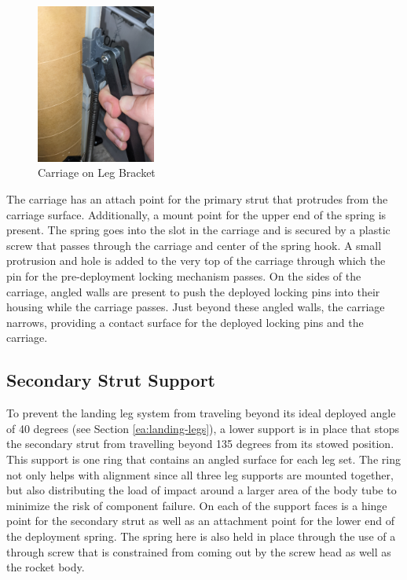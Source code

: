 \begin{figure}[H]
    \centering
    \includegraphics[width=0.35\textwidth]{src/figs/Carriage_Leg.jpg}
    \caption{Carriage on Leg Bracket}
    \label{fig:CLB}
\end{figure}

The carriage has an attach point for the primary strut that protrudes from the carriage surface. Additionally, a mount point for the upper end of the spring is present. The spring goes into the slot in the carriage and is secured by a plastic screw that passes through the carriage and center of the spring hook. A small protrusion and hole is added to the very top of the carriage through which the pin for the pre-deployment locking mechanism passes. On the sides of the carriage, angled walls are present to push the deployed locking pins into their housing while the carriage passes. Just beyond these angled walls, the carriage narrows, providing a contact surface for the deployed locking pins and the carriage.

\subsection{Secondary Strut Support}
To prevent the landing leg system from traveling beyond its ideal deployed angle of 40 degrees (see Section \ref{ea:landing-legs}), a lower support is in place that stops the secondary strut from travelling beyond 135 degrees from its stowed position. This support is one ring that contains an angled surface for each leg set. The ring not only helps with alignment since all three leg supports are mounted together, but also distributing the load of impact around a larger area of the body tube to minimize the risk of component failure. On each of the support faces is a hinge point for the secondary strut as well as an attachment point for the lower end of the deployment spring. The spring here is also held in place through the use of a through screw that is constrained from coming out by the screw head as well as the rocket body.